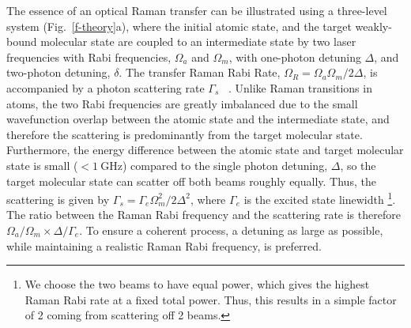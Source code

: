 \documentclass[aps,prl,twocolumn,superscriptaddress]{revtex4-1}
\begin{document}
The essence of an optical Raman transfer can be illustrated using a three-level system (Fig.~\ref{f-theory}a), where the initial atomic state, and the target weakly-bound molecular state are coupled to an intermediate state by two laser frequencies with Rabi frequencies, $\Omega_a$ and $\Omega_m$, with one-photon detuning $ \Delta $, and two-photon detuning, $ \delta$.  %
The transfer Raman Rabi Rate, $\Omega_R=\Omega_a\Omega_m / 2\Delta$, is accompanied by a photon scattering rate $\Gamma_s$
~\cite{Wineland2003}.
Unlike Raman transitions in atoms, the two Rabi frequencies are greatly imbalanced %
due to the small wavefunction overlap between the atomic state and the intermediate state, %
and therefore the scattering is predominantly from the target molecular state. Furthermore, the energy difference between the atomic state and target molecular state is small ($ < 1~\mathrm{GHz} $) compared to the single photon detuning, $ \Delta $, so the target molecular state can scatter off both beams roughly equally. Thus, the scattering is given by $ \Gamma_s=\Gamma_e \Omega_m^2 / 2\Delta^2$, where $ \Gamma_e $ is the excited state linewidth \footnote{We choose the two beams to have equal power, which gives the highest Raman Rabi rate at a fixed total power. Thus, this results in a simple factor of 2 coming from scattering off 2 beams.}.
The ratio between the Raman Rabi frequency and the scattering rate is therefore $ \Omega_a/\Omega_m \times \Delta/\Gamma_e $. %
To ensure a coherent process, a detuning as large as possible, while maintaining a realistic Raman Rabi frequency, is preferred. %
\end{document}
